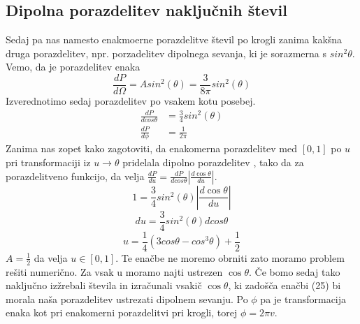 \documentclass[11pt, a4paper]{article}
\begin{document}
\subsection{Dipolna porazdelitev naključnih števil}
Sedaj pa nas namesto enakmoerne porazdelitve števil po krogli zanima kakšna druga porazdelitev, npr. porzadelitev dipolnega sevanja, ki je  sorazmerna s $sin^2 \theta$. Vemo, da je porazdelitev enaka
\begin{equation}
\frac{dP}{d \Omega}  = A sin^2 ( \theta) = \frac{3}{8 \pi} sin^2( \theta)
\end{equation}
Izverednotimo sedaj porazdelitev po vsakem kotu posebej.
\begin{equation}
\begin{split}
\frac{dP}{d cos\theta} &= \frac{3}{4} sin^2( \theta) \\
\frac{dP}{ d \phi } &= \frac{1}{2 \pi} 
\end{split}
\end{equation}
Zanima nas zopet kako zagotoviti, da enakomerna porazdelitev med $[0,1]$ po $u$ pri transformaciji iz $u \rightarrow \theta$ pridelala dipolno porazdelitev , tako da za porazdelitveno funkcijo, da velja $\frac{dP}{du} = \frac{ dP} {d cos \theta} | \frac{ d \cos \theta} {du} |$.
\begin{equation}
1 = \frac{3}{4} sin^2( \theta) | \frac{ d \cos \theta} {du} | 
\end{equation}
\begin{equation}
du = \frac{3}{4} sin^2( \theta) d cos \theta
\end{equation}
\begin{equation}
u = \frac{1}{4} (3 cos \theta - cos^3 \theta) + \frac{1}{2} 
\end{equation}
$ A = \frac{1}{2}$ da velja $u \in [0,1]$. Te enačbe ne moremo obrniti zato moramo problem rešiti numerično. Za vsak u moramo najti ustrezen $\cos \theta$. Če bomo sedaj tako naključno izžrebali števila in izračunali vsakič $\cos \theta$, ki zadošča enačbi (25) bi morala naša porazdelitev ustrezati dipolnem sevanju. Po $\phi$ pa je transformacija enaka kot pri enakomerni porazdelitvi pri krogli, torej $\phi = 2 \pi v$.
\end{document}
